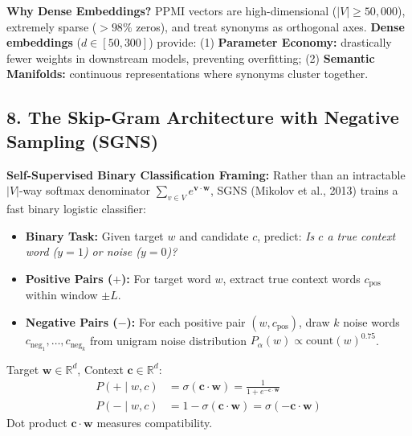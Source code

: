 \documentclass[10pt,a4paper]{article}
\begin{document}
\begin{overviewbox}
\footnotesize
\textbf{Why Dense Embeddings?} PPMI vectors are high-dimensional ($|V| \ge 50{,}000$), extremely sparse ($>98\%$ zeros), and treat synonyms as orthogonal axes. \textbf{Dense embeddings} ($d \in [50, 300]$) provide: (1) \textbf{Parameter Economy:} drastically fewer weights in downstream models, preventing overfitting; (2) \textbf{Semantic Manifolds:} continuous representations where synonyms cluster together.
\end{overviewbox}

\vspace{-3pt}
\subsection*{\color{themeblue} 8. The Skip-Gram Architecture with Negative Sampling (SGNS)}
\vspace{-2pt}

\noindent\begin{minipage}[t]{0.56\textwidth}
\footnotesize
\textbf{Self-Supervised Binary Classification Framing:}
Rather than an intractable $|V|$-way softmax denominator $\sum_{v \in V} e^{\mathbf{v} \cdot \mathbf{w}}$, SGNS (Mikolov et al., 2013) trains a fast binary logistic classifier:
\begin{itemize}[leftmargin=10pt,topsep=1pt,itemsep=1pt]
    \item \textbf{Binary Task:} Given target $w$ and candidate $c$, predict: \textit{Is $c$ a true context word ($y = 1$) or noise ($y = 0$)?}
    \item \textbf{Positive Pairs ($+$):} For target word $w$, extract true context words $c_{\text{pos}}$ within window $\pm L$.
    \item \textbf{Negative Pairs ($-$):} For each positive pair $(w, c_{\text{pos}})$, draw $k$ noise words $c_{\text{neg}_1}, \dots, c_{\text{neg}_k}$ from unigram noise distribution $P_\alpha(w) \propto \text{count}(w)^{0.75}$.
\end{itemize}
\end{minipage}\hfill
\begin{minipage}[t]{0.42\textwidth}
\begin{theoremprompt}[title={\textbf{Sigmoid Classifier Probabilities}}]
\footnotesize
Target $\mathbf{w} \in \mathbb{R}^d$, Context $\mathbf{c} \in \mathbb{R}^d$:
\begin{align}
    P(+ \mid w, c) &= \sigma(\mathbf{c} \cdot \mathbf{w}) = \frac{1}{1 + e^{-\mathbf{c} \cdot \mathbf{w}}} \\
    P(- \mid w, c) &= 1 - \sigma(\mathbf{c} \cdot \mathbf{w}) = \sigma(-\mathbf{c} \cdot \mathbf{w})
\end{align}
Dot product $\mathbf{c} \cdot \mathbf{w}$ measures compatibility.
\end{theoremprompt}
\end{minipage}
\end{document}

